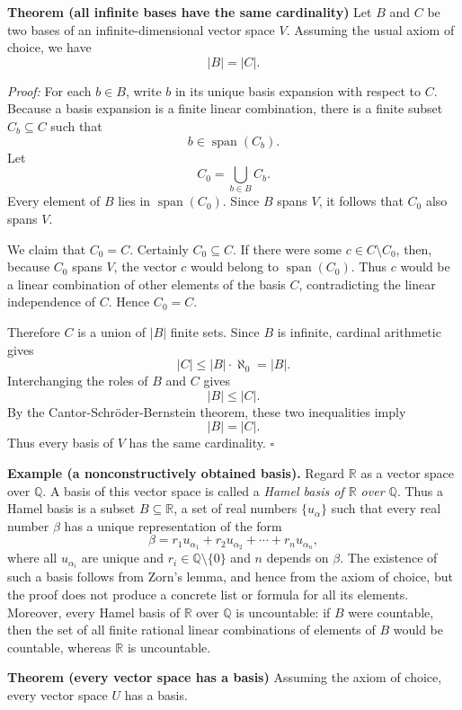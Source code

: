 \documentclass[a4paper,11pt,abstract=true]{scrartcl}
\theoremstyle{dotlessP}
\theoremstyle{dotlessS}
\theoremstyle{remark}
\theoremstyle{definition}
\begin{document}
\textbf{Theorem (all infinite bases have the same cardinality)} Let $B$ and
$C$ be two bases of an infinite-dimensional vector space $V$. Assuming the
usual axiom of choice, we have
\[
|B|=|C|.
\]

\textit{Proof:} For each $b\in B$, write $b$ in its unique basis expansion
with respect to $C$. Because a basis expansion is a finite linear combination,
there is a finite subset $C_b\subseteq C$ such that
\[
b\in\operatorname{span}(C_b).
\]
Let
\[
C_0=\bigcup_{b\in B}C_b.
\]
Every element of $B$ lies in $\operatorname{span}(C_0)$. Since $B$ spans
$V$, it follows that $C_0$ also spans $V$.

We claim that $C_0=C$. Certainly $C_0\subseteq C$. If there were some
$c\in C\setminus C_0$, then, because $C_0$ spans $V$, the vector $c$ would
belong to $\operatorname{span}(C_0)$. Thus $c$ would be a linear combination
of other elements of the basis $C$, contradicting the linear independence of
$C$. Hence $C_0=C$.

Therefore $C$ is a union of $|B|$ finite sets. Since $B$ is infinite,
cardinal arithmetic gives
\[
|C|\leq |B|\cdot\aleph_0=|B|.
\]
Interchanging the roles of $B$ and $C$ gives
\[
|B|\leq |C|.
\]
By the Cantor-Schr\"oder-Bernstein theorem, these two inequalities imply
\[
|B|=|C|.
\]
Thus every basis of $V$ has the same cardinality. \hfill$\square$

\begin{example_box}
\textbf{Example (a nonconstructively obtained basis).} Regard $\mathbb{R}$ as
a vector space over $\mathbb{Q}$. A basis of this vector space is called a
\emph{Hamel basis of $\mathbb{R}$ over $\mathbb{Q}$}. Thus a Hamel basis is a
subset $B\subseteq\mathbb{R}$, a set of real numbers $\{u_\alpha\}$ such that every real number $\beta$ has a unique representation of the form
\[
\beta = r_1 u_{\alpha_1} + r_2 u_{\alpha_2} + \cdots + r_n u_{\alpha_n},
\]
where all $u_{\alpha_i}$ are unique and $r_i\in\mathbb{Q}\setminus\{0\}$ and $n$ depends on $\beta$.
The existence of such a basis follows from Zorn's lemma, and hence from the
axiom of choice, but the proof does not produce a concrete list or formula
for all its elements. Moreover, every Hamel basis of $\mathbb{R}$ over
$\mathbb{Q}$ is uncountable: if $B$ were countable, then the set of all finite
rational linear combinations of elements of $B$ would be countable, whereas
$\mathbb{R}$ is uncountable. 
\end{example_box}

\textbf{Theorem (every vector space has a basis)} Assuming the axiom of
choice, every vector space $U$ has a basis.
\end{document}
